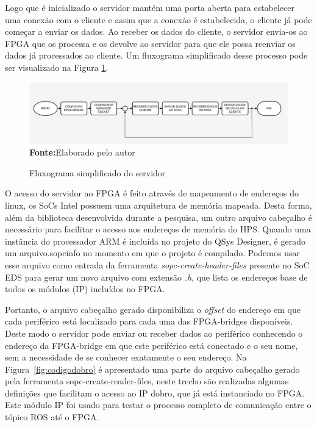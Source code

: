 Logo que é inicializado o servidor mantém uma porta aberta para estabelecer uma conexão com o cliente e assim que a conexão é estabelecida, o cliente já pode começar a enviar os dados. Ao receber os dados do cliente, o servidor envia-os ao FPGA que os processa e os devolve ao servidor para que ele possa reenviar os dados já processados ao cliente. Um fluxograma simplificado desse processo pode ser visualizado na Figura \ref{fig:fluxoServidor}.

\begin{figure}[ht]
	\caption{Fluxograma simplificado do servidor}
	\begin{center}
		\includegraphics[scale=0.41]{imagens/fluxogramaServidor.png}\\
		{\small \textbf{Fonte:}Elaborado pelo autor}
    \end{center}\label{fig:fluxoServidor}
\end{figure} 

O acesso do servidor ao FPGA é feito através de mapeamento de endereços do linux, os SoCs Intel possuem uma arquitetura de memória mapeada. Desta forma, além da biblioteca desenvolvida durante a pesquisa, um outro arquivo cabeçalho é necessário para facilitar o acesso aos endereços de memória do HPS\@. Quando uma instância do processador ARM é incluída no projeto do QSys Designer, é gerado um arquivo.sopcinfo no momento em que o projeto é compilado. Podemos usar esse arquivo como entrada da ferramenta \textit{sopc-create-header-files} presente no SoC EDS para gerar um novo arquivo com extensão \textit{.h}, que lista os endereços base de todos os módulos (IP) incluídos no FPGA\@. 

Portanto, o arquivo cabeçalho gerado disponibiliza o \textit{offset} do endereço em que cada periférico está localizado para cada uma das FPGA-bridges disponíveis. Deste modo o servidor pode enviar ou receber dados ao periférico conhecendo o endereço da FPGA-bridge em que este periférico está conectado e o seu nome, sem a necessidade de se conhecer exatamente o seu endereço. Na Figura~\ref{fig:codigodobro} é apresentado uma parte do arquivo cabeçalho gerado pela ferramenta sopc-create-reader-files, neste trecho são realizadas algumas definições que facilitam o acesso ao IP dobro, que já está instanciado no FPGA\@. Este módulo IP foi usado para testar o processo completo de comunicação entre o tópico ROS até o FPGA\@.

